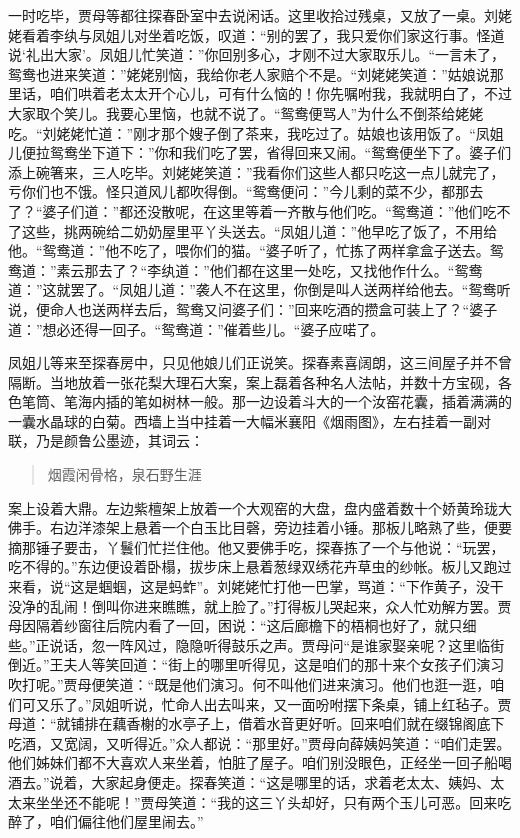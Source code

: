 \documentclass[12pt,oneside]{book}
\newenvironment{shici}{%
\begin{verse}%
\centering\large\hspace{12pt}}%
{\end{verse}}
\begin{document}
一时吃毕，贾母等都往探春卧室中去说闲话。这里收拾过残桌，又放了一桌。刘姥姥看着李纨与凤姐儿对坐着吃饭，叹道：“别的罢了，我只爱你们家这行事。怪道说‘礼出大家’。凤姐儿忙笑道：”你回别多心，才刚不过大家取乐儿。“一言未了，鸳鸯也进来笑道：”姥姥别恼，我给你老人家赔个不是。“刘姥姥笑道：”姑娘说那里话，咱们哄着老太太开个心儿，可有什么恼的！你先嘱咐我，我就明白了，不过大家取个笑儿。我要心里恼，也就不说了。“鸳鸯便骂人”为什么不倒茶给姥姥吃。“刘姥姥忙道：”刚才那个嫂子倒了茶来，我吃过了。姑娘也该用饭了。“凤姐儿便拉鸳鸯坐下道下：”你和我们吃了罢，省得回来又闹。“鸳鸯便坐下了。婆子们添上碗箸来，三人吃毕。刘姥姥笑道：”我看你们这些人都只吃这一点儿就完了，亏你们也不饿。怪只道风儿都吹得倒。“鸳鸯便问：”今儿剩的菜不少，都那去了？“婆子们道：”都还没散呢，在这里等着一齐散与他们吃。“鸳鸯道：”他们吃不了这些，挑两碗给二奶奶屋里平丫头送去。“凤姐儿道：”他早吃了饭了，不用给他。“鸳鸯道：”他不吃了，喂你们的猫。“婆子听了，忙拣了两样拿盒子送去。鸳鸯道：”素云那去了？“李纨道：”他们都在这里一处吃，又找他作什么。“鸳鸯道：”这就罢了。“凤姐儿道：”袭人不在这里，你倒是叫人送两样给他去。“鸳鸯听说，便命人也送两样去后，鸳鸯又问婆子们：”回来吃酒的攒盒可装上了？“婆子道：”想必还得一回子。“鸳鸯道：”催着些儿。“婆子应喏了。

凤姐儿等来至探春房中，只见他娘儿们正说笑。探春素喜阔朗，这三间屋子并不曾隔断。当地放着一张花梨大理石大案，案上磊着各种名人法帖，并数十方宝砚，各色笔筒、笔海内插的笔如树林一般。那一边设着斗大的一个汝窑花囊，插着满满的一囊水晶球的白菊。西墙上当中挂着一大幅米襄阳《烟雨图》，左右挂着一副对联，乃是颜鲁公墨迹，其词云：

\begin{shici}
烟霞闲骨格，泉石野生涯
\end{shici}


案上设着大鼎。左边紫檀架上放着一个大观窑的大盘，盘内盛着数十个娇黄玲珑大佛手。右边洋漆架上悬着一个白玉比目磬，旁边挂着小锤。那板儿略熟了些，便要摘那锤子要击，丫鬟们忙拦住他。他又要佛手吃，探春拣了一个与他说：“玩罢，吃不得的。”东边便设着卧榻，拔步床上悬着葱绿双绣花卉草虫的纱帐。板儿又跑过来看，说“这是蝈蝈，这是蚂蚱”。刘姥姥忙打他一巴掌，骂道：“下作黄子，没干没净的乱闹！倒叫你进来瞧瞧，就上脸了。”打得板儿哭起来，众人忙劝解方罢。贾母因隔着纱窗往后院内看了一回，困说：“这后廊檐下的梧桐也好了，就只细些。”正说话，忽一阵风过，隐隐听得鼓乐之声。贾母问“是谁家娶亲呢？这里临街倒近。”王夫人等笑回道：“街上的哪里听得见，这是咱们的那十来个女孩子们演习吹打呢。”贾母便笑道：“既是他们演习。何不叫他们进来演习。他们也逛一逛，咱们可又乐了。”凤姐听说，忙命人出去叫来，又一面吩咐摆下条桌，铺上红毡子。贾母道：“就铺排在藕香榭的水亭子上，借着水音更好听。回来咱们就在缀锦阁底下吃酒，又宽阔，又听得近。”众人都说：“那里好。”贾母向薛姨妈笑道：“咱们走罢。他们姊妹们都不大喜欢人来坐着，怕脏了屋子。咱们别没眼色，正经坐一回子船喝酒去。”说着，大家起身便走。探春笑道：“这是哪里的话，求着老太太、姨妈、太太来坐坐还不能呢！”贾母笑道：“我的这三丫头却好，只有两个玉儿可恶。回来吃醉了，咱们偏往他们屋里闹去。”
\end{document}
